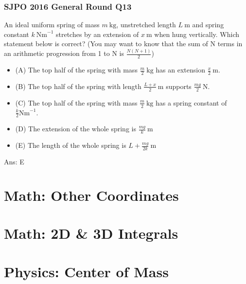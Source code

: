 \documentclass{article}
\begin{document}
\subsubsection{SJPO 2016 General Round Q13}
An ideal uniform spring of mass $m \mathrm{~kg}$, unstretched length $L \mathrm{~m}$ and spring constant $k\  \mathrm{Nm}^{-1}$ stretches by an extension of $x \mathrm{~m}$ when hung vertically. Which statement below is correct? (You may want to know that the sum of $\mathrm{N}$ terms in an arithmetic progression from 1 to $\mathrm{N}$ is $\frac{N(N+1)}{2}$)
\begin{itemize}
\item[] (A) The top half of the spring with mass $\frac{m}{2} \mathrm{~kg}$ has an extension $\frac{x}{2} \mathrm{~m}$.
\item[] (B) The top half of the spring with length $\frac{L+x}{2} \mathrm{~m}$ supports $\frac{m g}{2} \mathrm{~N}$.
\item[] (C) The top half of the spring with mass $\frac{m}{2} \mathrm{~kg}$ has a spring constant of $\frac{k}{2} \mathrm{Nm}^{-1}$.
\item[] (D) The extension of the whole spring is $\frac{m g}{k} \mathrm{~m}$
\item[] (E) The length of the whole spring is $L+\frac{m g}{2 k} \mathrm{~m}$
\end{itemize}
Ans: \ifpaper E \fi

\section{Math: Other Coordinates}
\section{Math: 2D \& 3D Integrals}
\clearpage
\section{Physics: Center of Mass}
\end{document}
